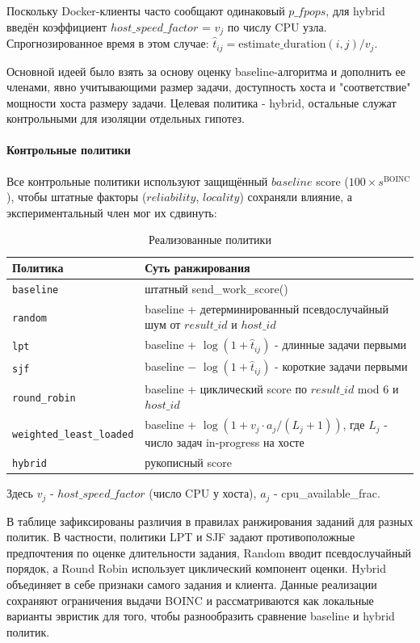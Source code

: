 \documentclass[a4paper,12pt]{extarticle}
\begin{document}
Поскольку Docker-клиенты часто сообщают одинаковый $p\_fpops$, для hybrid введён коэффициент $host\_speed\_factor$ = $v_j$ по числу CPU узла. Спрогнозированное время в этом случае: $\hat{t}_{ij} = \text{estimate\_duration}(i,j) / v_j$.

Основной идеей было взять за основу оценку baseline-алгоритма и дополнить ее членами, явно учитывающими размер задачи, доступность хоста и "соответствие" мощности хоста размеру задачи. Целевая политика - hybrid, остальные служат контрольными для изоляции отдельных гипотез.

\paragraph{Контрольные политики}
Все контрольные политики используют защищённый $baseline$ score ($100 \times s^{\text{BOINC}}$), чтобы штатные факторы ($reliability$, $locality$) сохраняли влияние, а экспериментальный член мог их сдвинуть:
\begin{table}[H]
    \centering
    \caption{Реализованные политики}
    \footnotesize
    \begin{tabular}{ll}
        \toprule
        Политика & Суть ранжирования \\
        \midrule
        \texttt{baseline} & штатный send\_work\_score() \\
        \texttt{random} & baseline + детерминированный псевдослучайный шум от $result\_id$ и $host\_id$ \\
        \texttt{lpt} & baseline + $\log(1 + \hat{t}_{ij})$ - длинные задачи первыми \\
        \texttt{sjf} & baseline $-$ $\log(1 + \hat{t}_{ij})$ - короткие задачи первыми \\
        \texttt{round\_robin} & baseline + циклический score по $result\_id$ mod 6 и $host\_id$ \\
        \texttt{weighted\_least\_loaded} & baseline + $\log(1 + v_j \cdot a_j / (L_j + 1))$, где $L_j$ - число задач in-progress на хосте \\
        \texttt{hybrid} & рукописный score \\
        \bottomrule
    \end{tabular}
\end{table}
Здесь $v_j$ - $host\_speed\_factor$ (число CPU у хоста), $a_j$ - cpu\_available\_frac.

В таблице зафиксированы различия в правилах ранжирования заданий для разных политик. В частности, политики LPT и SJF задают противоположные предпочтения по оценке длительности задания, Random вводит псевдослучайный порядок, а Round Robin использует циклический компонент оценки. Hybrid объединяет в себе признаки самого задания и клиента. Данные реализации сохраняют ограничения выдачи BOINC и рассматриваются как локальные варианты эвристик для того, чтобы разнообразить сравнение baseline и hybrid политик.
\end{document}
